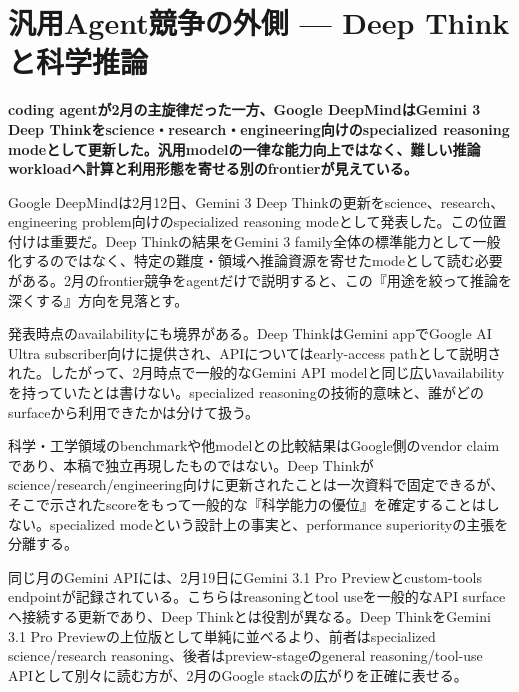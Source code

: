 \section{汎用Agent競争の外側 — Deep Thinkと科学推論}
\label{pkg:specialized-reasoning-science}
\noindent\textbf{coding agentが2月の主旋律だった一方、Google DeepMindはGemini 3 Deep Thinkをscience・research・engineering向けのspecialized reasoning modeとして更新した。汎用modelの一律な能力向上ではなく、難しい推論workloadへ計算と利用形態を寄せる別のfrontierが見えている。}\autocite{src-dd5d9b8662f3}

Google DeepMindは2月12日、Gemini 3 Deep Thinkの更新をscience、research、engineering problem向けのspecialized reasoning modeとして発表した。この位置付けは重要だ。Deep Thinkの結果をGemini 3 family全体の標準能力として一般化するのではなく、特定の難度・領域へ推論資源を寄せたmodeとして読む必要がある。2月のfrontier競争をagentだけで説明すると、この『用途を絞って推論を深くする』方向を見落とす。\autocite{src-dd5d9b8662f3}


\begin{claimboundary}
発表時点のavailabilityにも境界がある。Deep ThinkはGemini appでGoogle AI Ultra subscriber向けに提供され、APIについてはearly-access pathとして説明された。したがって、2月時点で一般的なGemini API modelと同じ広いavailabilityを持っていたとは書けない。specialized reasoningの技術的意味と、誰がどのsurfaceから利用できたかは分けて扱う。\autocite{src-dd5d9b8662f3}
\end{claimboundary}

\begin{claimboundary}
科学・工学領域のbenchmarkや他modelとの比較結果はGoogle側のvendor claimであり、本稿で独立再現したものではない。Deep Thinkがscience/research/engineering向けに更新されたことは一次資料で固定できるが、そこで示されたscoreをもって一般的な『科学能力の優位』を確定することはしない。specialized modeという設計上の事実と、performance superiorityの主張を分離する。\autocite{src-dd5d9b8662f3}
\end{claimboundary}

同じ月のGemini APIには、2月19日にGemini 3.1 Pro Previewとcustom-tools endpointが記録されている。こちらはreasoningとtool useを一般的なAPI surfaceへ接続する更新であり、Deep Thinkとは役割が異なる。Deep ThinkをGemini 3.1 Pro Previewの上位版として単純に並べるより、前者はspecialized science/research reasoning、後者はpreview-stageのgeneral reasoning/tool-use APIとして別々に読む方が、2月のGoogle stackの広がりを正確に表せる。\autocite{src-a24fd97eb3d0}


